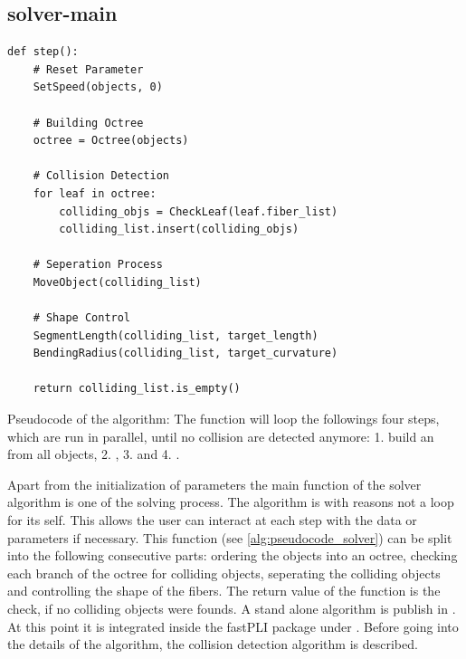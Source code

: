 \subsection{solver-main}
% 
\begin{lstfloat}[!tb]
\lstset{style=python}
\begin{lstlisting}[]
def step():
    # Reset Parameter
    SetSpeed(objects, 0)
    
    # Building Octree
    octree = Octree(objects)
    
    # Collision Detection
    for leaf in octree:
        colliding_objs = CheckLeaf(leaf.fiber_list)
        colliding_list.insert(colliding_objs)
	
    # Seperation Process
    MoveObject(colliding_list)
	
    # Shape Control
    SegmentLength(colliding_list, target_length)
    BendingRadius(colliding_list, target_curvature)

    return colliding_list.is_empty()
\end{lstlisting}
\caption{Pseudocode of the  algorithm: The function  will loop the followings four steps, which are run in parallel, until no collision are detected anymore: 1. build an  from all objects, 2. , 3.  and 4. . }
\label{alg:pseudocode_solver}
\end{lstfloat}
% 
Apart from the initialization of parameters the main function of the solver algorithm is one  of the solving process.
The algorithm is with reasons not a loop for its self. This allows the user can interact at each step with the data or parameters if necessary.
This  function (see \cref{alg:pseudocode_solver}) can be split into the following consecutive parts:
ordering the objects into an octree, checking each branch of the octree for colliding objects, seperating the colliding objects and controlling the shape of the fibers.
The return value of the function is the check, if no colliding objects were founds.
%
A stand alone algorithm is publish in \cite{Matuschke2019}.
At this point it is integrated inside the \ac{fastPLI} package under .
Before going into the details of the algorithm, the collision detection algorithm is described.
% 
% 
% 
